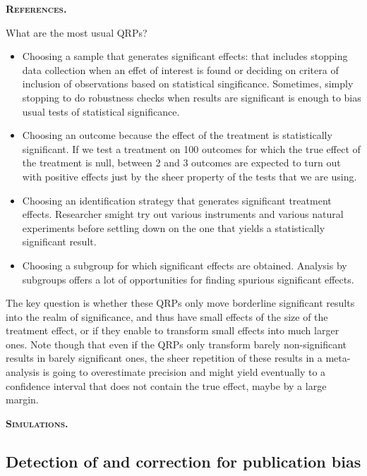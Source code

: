 \documentclass[]{book}
\providecommand{\tightlist}{%
  \setlength{\itemsep}{0pt}\setlength{\parskip}{0pt}}
\theoremstyle{definition}
\theoremstyle{definition}
\theoremstyle{definition}
\theoremstyle{remark}
\begin{document}
\textbf{\textsc{References.}}

What are the most usual QRPs?

\begin{itemize}
\tightlist
\item
  Choosing a sample that generates significant effects: that includes stopping data collection when an effet of interest is found or deciding on critera of inclusion of observations based on statistical singificance.
  Sometimes, simply stopping to do robustness checks when results are significant is enough to bias usual tests of statistical significance.
\item
  Choosing an outcome because the effect of the treatment is statistically significant.
  If we test a treatment on 100 outcomes for which the true effect of the treatment is null, between 2 and 3 outcomes are expected to turn out with positive effects just by the sheer property of the tests that we are using.
\item
  Choosing an identification strategy that generates significant treatment effects.
  Researcher smight try out various instruments and various natural experiments before settling down on the one that yields a statistically significant result.
\item
  Choosing a subgroup for which significant effects are obtained.
  Analysis by subgroups offers a lot of opportunities for finding spurious significant effects.
\end{itemize}

The key question is whether these QRPs only move borderline significant results into the realm of significance, and thus have small effects of the size of the treatment effect, or if they enable to transform small effects into much larger ones.
Note though that even if the QRPs only transform barely non-significant results in barely significant ones, the sheer repetition of these results in a meta-analysis is going to overestimate precision and might yield eventually to a confidence interval that does not contain the true effect, maybe by a large margin.

\textbf{\textsc{Simulations.}}

\hypertarget{detection-of-and-correction-for-publication-bias}{%
\subsection{Detection of and correction for publication bias}\label{detection-of-and-correction-for-publication-bias}}
\end{document}
